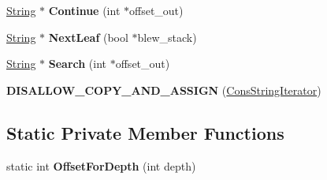 \begin{DoxyCompactItemize}
\item 
\hyperlink{classv8_1_1internal_1_1_string}{String} $\ast$ {\bfseries Continue} (int $\ast$offset\+\_\+out)\hypertarget{classv8_1_1internal_1_1_cons_string_iterator_a87e8f56b1024a3f90df4932e040e79b1}{}\label{classv8_1_1internal_1_1_cons_string_iterator_a87e8f56b1024a3f90df4932e040e79b1}

\item 
\hyperlink{classv8_1_1internal_1_1_string}{String} $\ast$ {\bfseries Next\+Leaf} (bool $\ast$blew\+\_\+stack)\hypertarget{classv8_1_1internal_1_1_cons_string_iterator_a2fddd5ed3e907cf2ba186b170ef06cd7}{}\label{classv8_1_1internal_1_1_cons_string_iterator_a2fddd5ed3e907cf2ba186b170ef06cd7}

\item 
\hyperlink{classv8_1_1internal_1_1_string}{String} $\ast$ {\bfseries Search} (int $\ast$offset\+\_\+out)\hypertarget{classv8_1_1internal_1_1_cons_string_iterator_a12943f68c1bbd9921e6c8bbdfc6ac2c2}{}\label{classv8_1_1internal_1_1_cons_string_iterator_a12943f68c1bbd9921e6c8bbdfc6ac2c2}

\item 
{\bfseries D\+I\+S\+A\+L\+L\+O\+W\+\_\+\+C\+O\+P\+Y\+\_\+\+A\+N\+D\+\_\+\+A\+S\+S\+I\+GN} (\hyperlink{classv8_1_1internal_1_1_cons_string_iterator}{Cons\+String\+Iterator})\hypertarget{classv8_1_1internal_1_1_cons_string_iterator_a668cffd012227bd0340c3203b359a0a3}{}\label{classv8_1_1internal_1_1_cons_string_iterator_a668cffd012227bd0340c3203b359a0a3}

\end{DoxyCompactItemize}
\subsection*{Static Private Member Functions}
\begin{DoxyCompactItemize}
\item 
static int {\bfseries Offset\+For\+Depth} (int depth)\hypertarget{classv8_1_1internal_1_1_cons_string_iterator_a26d21314202e4ae894bfe2abaef8f414}{}\label{classv8_1_1internal_1_1_cons_string_iterator_a26d21314202e4ae894bfe2abaef8f414}

\end{DoxyCompactItemize}

